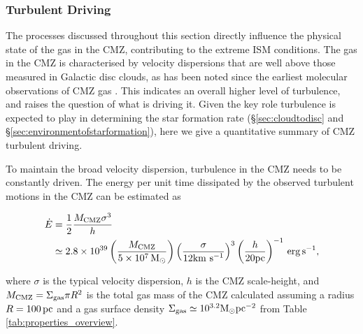 \subsubsection{Turbulent Driving}
\label{sec:turbulentdriving}
The processes discussed throughout this section directly influence the physical state of the gas in the CMZ, contributing to the extreme ISM conditions.
The gas in the CMZ is characterised by velocity dispersions that are well above those measured in Galactic disc clouds, as has been noted since the earliest molecular observations of CMZ gas \citep{Bally1987}. This indicates an overall higher level of turbulence, and raises the question of what is driving it. Given the key role turbulence is expected to play in determining the star formation rate (\S\ref{sec:cloudtodisc} and \S\ref{sec:environmentofstarformation}), here we give a quantitative summary of CMZ turbulent driving.

To maintain the broad velocity dispersion, turbulence in the CMZ needs to be constantly driven.
The energy per unit time dissipated by the observed turbulent motions in the CMZ can be estimated as \citep[e.g.][]{MacLow2004} 

\setlength{\mathindent}{0pt}

\begin{footnotesize}

\begin{align} \label{eq:turb1}
    \dot{E} &= \frac{1}{2} \frac{M_\mathrm{CMZ} \sigma^{3}}{h} \nonumber \\
    & \simeq 2.8 \times 10^{39} \left(\frac{M_{\rm CMZ}}{5\times10^7\, \mbox{M$_\odot$}} \right) \left(\frac{\sigma}{12 \mbox{${\rm km}~{\rm s}^{-1}$}}\right)^3 \left(\frac{h}{20\mbox{${\rm pc}$}}\right)^{-1}  \, \mathrm{erg\,s^{-1}},
\end{align}
\end{footnotesize}
%
where $\sigma$ is the typical velocity dispersion, $h$ is the CMZ scale-height, and $M_{\rm CMZ}= \Sigma_{\rm gas} \pi R^2 $ is the total gas mass of the CMZ calculated assuming a radius $R=100\,\mbox{${\rm pc}$}$ and a gas surface density $\Sigma_{\rm gas}\simeq10^{3.2} \mbox{M$_\odot$} \mbox{${\rm pc}$}^{-2}$ from Table \ref{tab:properties_overview}. %

